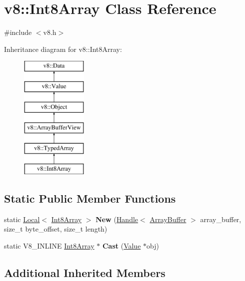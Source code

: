\hypertarget{classv8_1_1_int8_array}{}\section{v8\+:\+:Int8\+Array Class Reference}
\label{classv8_1_1_int8_array}


{\ttfamily \#include $<$v8.\+h$>$}

Inheritance diagram for v8\+:\+:Int8\+Array\+:\begin{figure}[H]
\begin{center}
\leavevmode
\includegraphics[height=6.000000cm]{classv8_1_1_int8_array}
\end{center}
\end{figure}
\subsection*{Static Public Member Functions}
\begin{DoxyCompactItemize}
\item 
\hypertarget{classv8_1_1_int8_array_a40454c011895180c803650ba7294139b}{}static \hyperlink{classv8_1_1_local}{Local}$<$ \hyperlink{classv8_1_1_int8_array}{Int8\+Array} $>$ {\bfseries New} (\hyperlink{classv8_1_1_handle}{Handle}$<$ \hyperlink{classv8_1_1_array_buffer}{Array\+Buffer} $>$ array\+\_\+buffer, size\+\_\+t byte\+\_\+offset, size\+\_\+t length)\label{classv8_1_1_int8_array_a40454c011895180c803650ba7294139b}

\item 
\hypertarget{classv8_1_1_int8_array_a201a6b46e2cc455830d62c57bc8b4a3e}{}static V8\+\_\+\+I\+N\+L\+I\+N\+E \hyperlink{classv8_1_1_int8_array}{Int8\+Array} $\ast$ {\bfseries Cast} (\hyperlink{classv8_1_1_value}{Value} $\ast$obj)\label{classv8_1_1_int8_array_a201a6b46e2cc455830d62c57bc8b4a3e}

\end{DoxyCompactItemize}
\subsection*{Additional Inherited Members}


